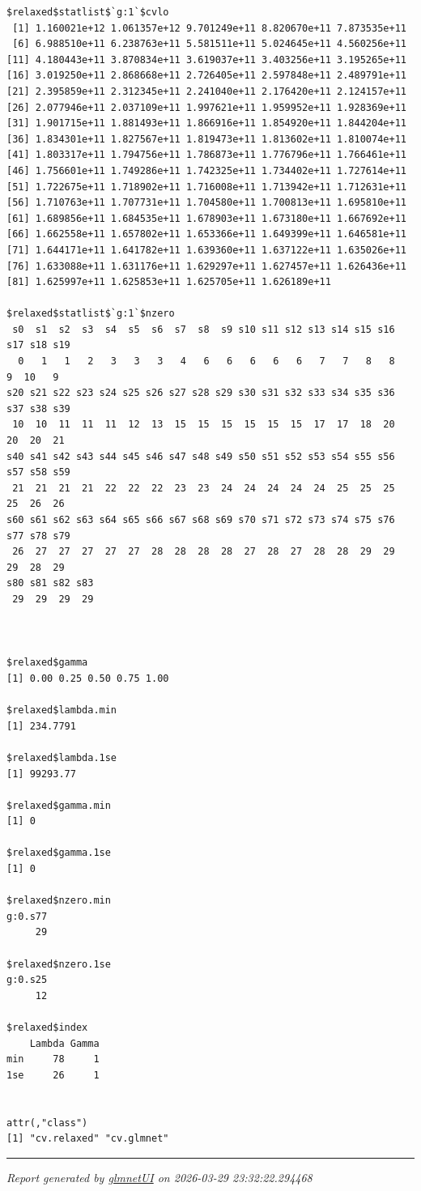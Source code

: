 \documentclass[
]{article}
\begin{document}
\begin{verbatim}
$relaxed$statlist$`g:1`$cvlo
 [1] 1.160021e+12 1.061357e+12 9.701249e+11 8.820670e+11 7.873535e+11
 [6] 6.988510e+11 6.238763e+11 5.581511e+11 5.024645e+11 4.560256e+11
[11] 4.180443e+11 3.870834e+11 3.619037e+11 3.403256e+11 3.195265e+11
[16] 3.019250e+11 2.868668e+11 2.726405e+11 2.597848e+11 2.489791e+11
[21] 2.395859e+11 2.312345e+11 2.241040e+11 2.176420e+11 2.124157e+11
[26] 2.077946e+11 2.037109e+11 1.997621e+11 1.959952e+11 1.928369e+11
[31] 1.901715e+11 1.881493e+11 1.866916e+11 1.854920e+11 1.844204e+11
[36] 1.834301e+11 1.827567e+11 1.819473e+11 1.813602e+11 1.810074e+11
[41] 1.803317e+11 1.794756e+11 1.786873e+11 1.776796e+11 1.766461e+11
[46] 1.756601e+11 1.749286e+11 1.742325e+11 1.734402e+11 1.727614e+11
[51] 1.722675e+11 1.718902e+11 1.716008e+11 1.713942e+11 1.712631e+11
[56] 1.710763e+11 1.707731e+11 1.704580e+11 1.700813e+11 1.695810e+11
[61] 1.689856e+11 1.684535e+11 1.678903e+11 1.673180e+11 1.667692e+11
[66] 1.662558e+11 1.657802e+11 1.653366e+11 1.649399e+11 1.646581e+11
[71] 1.644171e+11 1.641782e+11 1.639360e+11 1.637122e+11 1.635026e+11
[76] 1.633088e+11 1.631176e+11 1.629297e+11 1.627457e+11 1.626436e+11
[81] 1.625997e+11 1.625853e+11 1.625705e+11 1.626189e+11

$relaxed$statlist$`g:1`$nzero
 s0  s1  s2  s3  s4  s5  s6  s7  s8  s9 s10 s11 s12 s13 s14 s15 s16 s17 s18 s19 
  0   1   1   2   3   3   3   4   6   6   6   6   6   7   7   8   8   9  10   9 
s20 s21 s22 s23 s24 s25 s26 s27 s28 s29 s30 s31 s32 s33 s34 s35 s36 s37 s38 s39 
 10  10  11  11  11  12  13  15  15  15  15  15  15  17  17  18  20  20  20  21 
s40 s41 s42 s43 s44 s45 s46 s47 s48 s49 s50 s51 s52 s53 s54 s55 s56 s57 s58 s59 
 21  21  21  21  22  22  22  23  23  24  24  24  24  24  25  25  25  25  26  26 
s60 s61 s62 s63 s64 s65 s66 s67 s68 s69 s70 s71 s72 s73 s74 s75 s76 s77 s78 s79 
 26  27  27  27  27  27  28  28  28  28  27  28  27  28  28  29  29  29  28  29 
s80 s81 s82 s83 
 29  29  29  29 



$relaxed$gamma
[1] 0.00 0.25 0.50 0.75 1.00

$relaxed$lambda.min
[1] 234.7791

$relaxed$lambda.1se
[1] 99293.77

$relaxed$gamma.min
[1] 0

$relaxed$gamma.1se
[1] 0

$relaxed$nzero.min
g:0.s77 
     29 

$relaxed$nzero.1se
g:0.s25 
     12 

$relaxed$index
    Lambda Gamma
min     78     1
1se     26     1


attr(,"class")
[1] "cv.relaxed" "cv.glmnet" 
\end{verbatim}

\begin{center}\rule{0.5\linewidth}{0.5pt}\end{center}

\emph{Report generated by
\href{https://github.com/wcraytor/glmnetUI}{glmnetUI} on 2026-03-29
23:32:22.294468}
\end{document}
